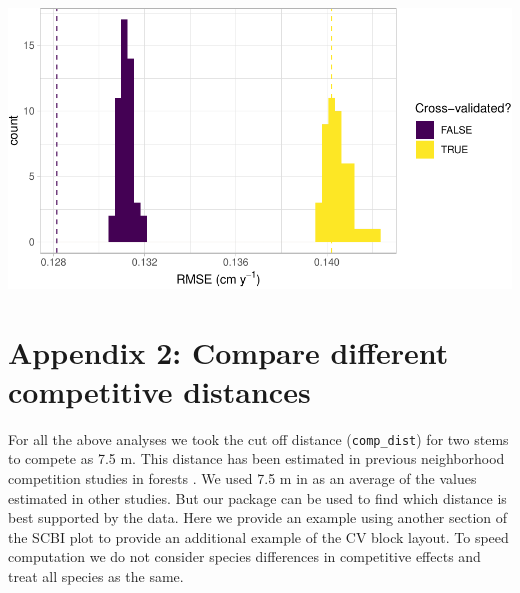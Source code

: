 \documentclass[12pt]{article}
\begin{document}
\begin{center}\includegraphics[width=1\linewidth]{Figures/appendix1-code-1} \end{center}

\hypertarget{mult-dist}{%
\section{Appendix 2: Compare different competitive
distances}\label{mult-dist}}

For all the above analyses we took the cut off distance
(\texttt{comp\_dist}) for two stems to compete as 7.5 m. This distance
has been estimated in previous neighborhood competition studies in
forests \citep[\citet{uriarte_spatially_2004},
\citet{canham_neighborhood_2006}]{canham_neighborhood_2004}. We used 7.5
m in \citet{allen_permutation_2020} as an average of the values
estimated in other studies. But our package can be used to find which
distance is best supported by the data. Here we provide an example using
another section of the SCBI plot to provide an additional example of the
CV block layout. To speed computation we do not consider species
differences in competitive effects and treat all species as the same.
\end{document}
